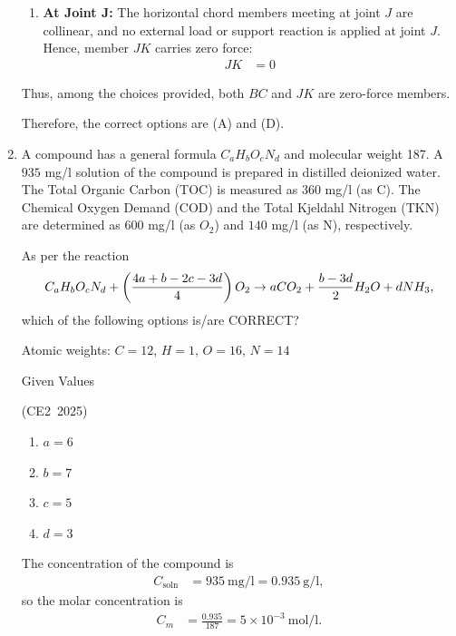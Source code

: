 \begin{enumerate}[label=\thesubsection.\arabic*, ref=\thesubsection.\theenumi,itemsep=0pt]
\begin{enumerate}
    \item \textbf{At Joint J:} The horizontal chord members meeting at joint $J$ are collinear, and no external load or support reaction is applied at joint $J$. Hence, member $JK$ carries zero force:
    \begin{align}
    JK &= 0
    \end{align}
\end{enumerate}

Thus, among the choices provided, both $BC$ and $JK$ are zero-force members.

Therefore, the correct options are (A) and (D).


\item
A compound has a general formula \(C_aH_bO_cN_d\) and molecular weight 187.
A \(935\) mg/l solution of the compound is prepared in distilled deionized water.
The Total Organic Carbon (TOC) is measured as \(360\) mg/l (as C). The Chemical
Oxygen Demand (COD) and the Total Kjeldahl Nitrogen (TKN) are determined as
\(600\) mg/l (as \(O_2\)) and \(140\) mg/l (as N), respectively.

As per the reaction
\begin{align}
C_aH_bO_cN_d+
\left(\frac{4a+b-2c-3d}{4}\right)O_2
\rightarrow
aCO_2+\frac{b-3d}{2}H_2O+dNH_3,
\end{align}
which of the following options is/are CORRECT?

Atomic weights: $C=12$, $H=1$, $O=16$, $N=14$
\setcounter{table}{0}
\begin{table}[H]
	\centering
	
	\caption{Given Values}
	\label{tab:Given_values}
\end{table}

\hfill (CE2~2025)

\begin{multicols}{4}\begin{enumerate}
    \item \(a=6\)
    \item \(b=7\)
    \item \(c=5\)
    \item \(d=3\)
\end{enumerate}\end{multicols}

\solution
The concentration of the compound is
\begin{align}
C_{\mathrm{soln}}
&=935\ \text{mg/l}=0.935\ \text{g/l},
\end{align}
so the molar concentration is
\begin{align}
C_m
&=\frac{0.935}{187}=5\times10^{-3}\ \text{mol/l}.
\end{align}


\end{enumerate}
